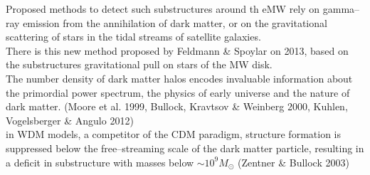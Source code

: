 \documentclass[paper=a4, fontsize=11pt]{scrartcl} %
\numberwithin{equation}{section} %
\numberwithin{figure}{section} %
\numberwithin{table}{section} %
\begin{document}




 

Proposed methods to detect such substructures around th eMW rely on gamma--ray emission from the annihilation of dark matter, or on the gravitational scattering of stars in the tidal streams of satellite galaxies.\\
There is this new method proposed by Feldmann \& Spoylar on 2013, based on the substructures gravitational pull on stars of the MW disk.\\
The number density of dark matter halos encodes invaluable information about the primordial power spectrum, the physics of early universe and the nature of dark matter. (Moore et al. 1999, Bullock, Kravtsov \& Weinberg 2000, Kuhlen, Vogelsberger \& Angulo 2012)\\
in WDM models, a competitor of the CDM paradigm, structure formation is suppressed below the free--streaming scale of the dark matter particle, resulting in a deficit in substructure with masses below $\sim 10^9 M_\odot$ (Zentner \& Bullock 2003)\\
\end{document}
